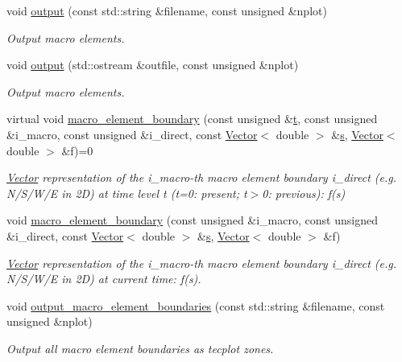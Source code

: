 \begin{DoxyCompactItemize}
void \hyperlink{classoomph_1_1Domain_a7b0c50db44e3bc3c8ae1a0d34ac835c8}{output} (const std\+::string \&filename, const unsigned \&nplot)
\begin{DoxyCompactList}\small\item\em Output macro elements. \end{DoxyCompactList}\item 
void \hyperlink{classoomph_1_1Domain_ab7ccc375ba2e46ffb11e4e2c5c485578}{output} (std\+::ostream \&outfile, const unsigned \&nplot)
\begin{DoxyCompactList}\small\item\em Output macro elements. \end{DoxyCompactList}\item 
virtual void \hyperlink{classoomph_1_1Domain_a95f3e00d28ea37e6c4d3027bfac91096}{macro\+\_\+element\+\_\+boundary} (const unsigned \&\hyperlink{cfortran_8h_af6f0bd3dc13317f895c91323c25c2b8f}{t}, const unsigned \&i\+\_\+macro, const unsigned \&i\+\_\+direct, const \hyperlink{classoomph_1_1Vector}{Vector}$<$ double $>$ \&\hyperlink{cfortran_8h_ab7123126e4885ef647dd9c6e3807a21c}{s}, \hyperlink{classoomph_1_1Vector}{Vector}$<$ double $>$ \&f)=0
\begin{DoxyCompactList}\small\item\em \hyperlink{classoomph_1_1Vector}{Vector} representation of the i\+\_\+macro-\/th macro element boundary i\+\_\+direct (e.\+g. N/\+S/\+W/E in 2D) at time level t (t=0\+: present; t$>$0\+: previous)\+: f(s) \end{DoxyCompactList}\item 
void \hyperlink{classoomph_1_1Domain_a9d293b736e74bfeace64c1c8858add8a}{macro\+\_\+element\+\_\+boundary} (const unsigned \&i\+\_\+macro, const unsigned \&i\+\_\+direct, const \hyperlink{classoomph_1_1Vector}{Vector}$<$ double $>$ \&\hyperlink{cfortran_8h_ab7123126e4885ef647dd9c6e3807a21c}{s}, \hyperlink{classoomph_1_1Vector}{Vector}$<$ double $>$ \&f)
\begin{DoxyCompactList}\small\item\em \hyperlink{classoomph_1_1Vector}{Vector} representation of the i\+\_\+macro-\/th macro element boundary i\+\_\+direct (e.\+g. N/\+S/\+W/E in 2D) at current time\+: f(s). \end{DoxyCompactList}\item 
void \hyperlink{classoomph_1_1Domain_ac663be35932981a1c02b3ed930ec2eda}{output\+\_\+macro\+\_\+element\+\_\+boundaries} (const std\+::string \&filename, const unsigned \&nplot)
\begin{DoxyCompactList}\small\item\em Output all macro element boundaries as tecplot zones. \end{DoxyCompactList}\item 

\end{DoxyCompactItemize}
